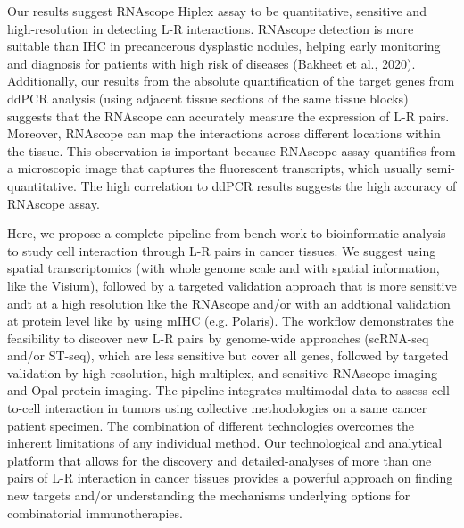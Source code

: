 Our results suggest RNAscope Hiplex assay to be quantitative, sensitive and high-resolution in detecting L-R interactions. RNAscope detection is more suitable than IHC in precancerous dysplastic nodules, helping early monitoring and diagnosis for patients with high risk of diseases (Bakheet et al., 2020). Additionally, our results from the absolute quantification of the target genes from ddPCR analysis (using adjacent tissue sections of the same tissue blocks) suggests that the RNAscope can accurately measure the expression of L-R pairs. Moreover, RNAscope can map the interactions across different locations within the tissue. This observation is important because RNAscope assay quantifies from a microscopic image that captures the fluorescent transcripts, which usually semi-quantitative. The high correlation to ddPCR results suggests the high accuracy of RNAscope assay. 

Here, we propose a complete pipeline from bench work to bioinformatic analysis to study cell interaction through L-R pairs in cancer tissues. We suggest using spatial transcriptomics (with whole genome scale and with spatial information, like the Visium), followed by a targeted validation approach that is more sensitive andt at a high resolution like the RNAscope and/or with an addtional validation at protein level like by using mIHC (e.g. Polaris). The workflow demonstrates the feasibility to discover new L-R pairs by genome-wide approaches (scRNA-seq and/or ST-seq), which are less sensitive but cover all genes, followed by targeted validation by high-resolution, high-multiplex, and sensitive RNAscope imaging and Opal protein imaging. The pipeline integrates multimodal data to assess cell-to-cell interaction in tumors using collective methodologies on a same cancer patient specimen. The combination of different technologies overcomes the inherent limitations of any individual method. Our technological and analytical platform that allows for the discovery and detailed-analyses of more than one pairs of L-R interaction in cancer tissues provides a powerful approach on finding new targets and/or understanding the mechanisms underlying options for combinatorial immunotherapies.

